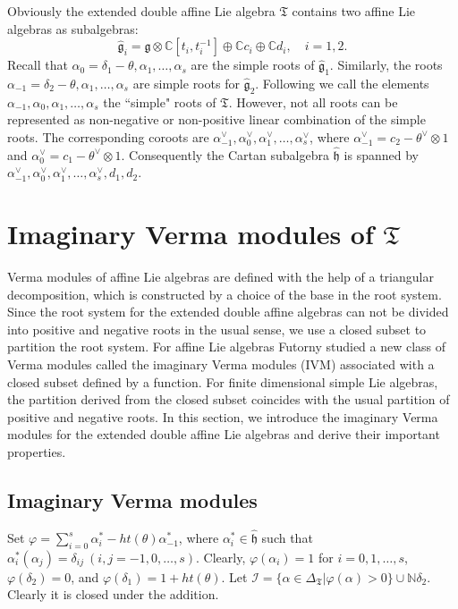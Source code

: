 \documentclass[11pt]{amsproc}
\theoremstyle{definition}
\theoremstyle{remark}
\numberwithin{equation}{section} \errorcontextlines=0
\begin{document}
Obviously the extended double affine Lie algebra $\mathfrak T$
contains two affine Lie algebras as subalgebras:
$$\hat{\mathfrak{g}}_i=\mathfrak{g}\otimes\mathbb{C}[t_i,t_i^{-1}]\oplus\mathbb{C}c_i\oplus\mathbb{C}d_i,
\quad i=1, 2.$$
Recall that \cite{VG} $\alpha_{0}=\delta_1-\theta,\alpha_1,\ldots,\alpha_s$
are the simple roots of $\hat{\mathfrak g}_1$. Similarly, the roots
$\alpha_{-1}=\delta_2-\theta,\alpha_1,\ldots,\alpha_s$ are simple roots for
$\hat{\mathfrak g}_2$. Following \cite{MS} we call the elements
$\alpha_{-1},\alpha_0,\alpha_1,\ldots,\alpha_s$ the
``simple" roots of $\mathfrak T$. However, not all
roots can be represented as non-negative or non-positive linear
combination of the simple roots. The corresponding coroots are
$\alpha_{-1}^{\vee},\alpha_0^{\vee},\alpha_1^{\vee},\ldots,\alpha_s^{\vee}$,
where $\alpha_{-1}^{\vee}=c_2-\theta^{\vee}\otimes 1$ and
$\alpha_0^{\vee}=c_1-\theta^{\vee}\otimes 1$. Consequently the
Cartan subalgebra $\hat{\mathfrak h}$ is spanned by
$\alpha_{-1}^{\vee},\alpha_0^{\vee},\alpha_1^{\vee},\ldots,\alpha_s^{\vee},d_1,d_2$.

\section{Imaginary Verma modules of $\mathfrak T$}
Verma modules of affine Lie algebras are defined with the help of a
triangular decomposition, which is constructed by a choice of
the base in the root system. Since the root system for the extended
double affine algebras can not be divided into positive and
negative roots in the usual sense, we use a closed subset to
partition the root system. For affine Lie algebras Futorny \cite{F}
studied a new class of Verma modules called the imaginary Verma
modules (IVM) \cite{DFF, RF} associated with a
closed subset defined by a function. For finite dimensional simple Lie
algebras, the partition derived from the closed subset coincides
with the usual partition of positive and negative roots. In this
section, we introduce the imaginary Verma modules for the extended
double affine Lie algebras and derive their important properties.

\subsection{Imaginary Verma modules}

Set $\varphi=\sum\limits_{i=0}^s
\alpha_{i}^{\ast}-ht(\theta)\alpha_{-1}^{\ast}$, where
$\alpha_i^{\ast}\in\hat{\mathfrak h}$ such that
$\alpha_i^{\ast}(\alpha_j)=\delta_{ij} ~(i,j=-1,0,\ldots,s)$.
Clearly, $\varphi(\alpha_i)=1$ for $i=0,1,\ldots, s$,
$\varphi(\delta_2)=0$, and $\varphi(\delta_1)=1+ht(\theta)$.  Let
$\mathcal {I}=\{\alpha\in\Delta_{\mathfrak T}|\varphi(\alpha)>
0\}\cup \mathbb{N}\delta_2$.
Clearly it is closed under the addition.
\end{document}
